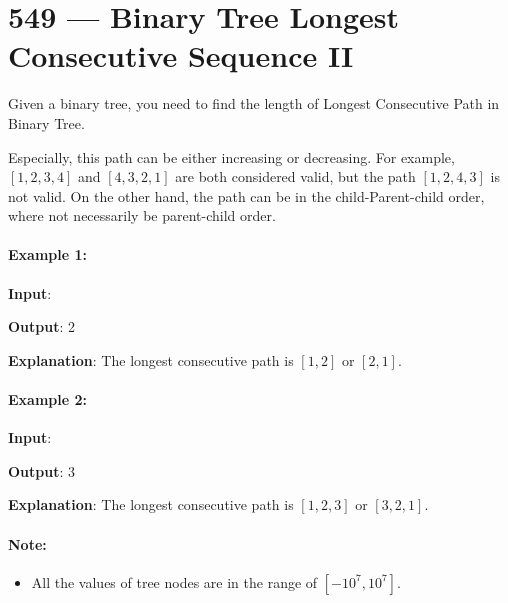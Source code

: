 \section{549 --- Binary Tree Longest Consecutive Sequence II}
Given a binary tree, you need to find the length of Longest Consecutive Path in Binary Tree.

Especially, this path can be either increasing or decreasing. For example, $ [1,2,3,4] $ and $ [4,3,2,1] $ are both considered valid, but the path $ [1,2,4,3] $ is not valid. On the other hand, the path can be in the child-Parent-child order, where not necessarily be parent-child order.

\paragraph{Example 1:}
\begin{flushleft}

\textbf{Input}:
\begin{figure}[H]
\end{figure}
\textbf{Output}: 2

\textbf{Explanation}: The longest consecutive path is $[1, 2]$ or $[2, 1]$.
 

\end{flushleft}

\paragraph{Example 2:}
\begin{flushleft}
\textbf{Input}:
\begin{figure}[H]
\end{figure}


\textbf{Output}: 3

\textbf{Explanation}: The longest consecutive path is $ [1, 2, 3] $ or $ [3, 2, 1] $.
\end{flushleft}
 

\paragraph{Note:} 
\begin{itemize}
\item All the values of tree nodes are in the range of $[-10^{7}, 10^{7}]$.
\end{itemize}

